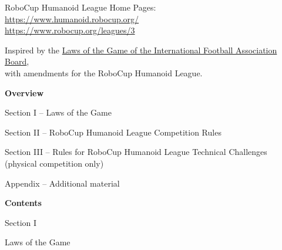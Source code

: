 \documentclass[a4paper]{article}
\begin{document}
    \medskip
    RoboCup Humanoid League Home Pages:\\
    \url{https://www.humanoid.robocup.org/}\\
    \url{https://www.robocup.org/leagues/3}

    \medskip
    Inspired by the \href{https://resources.fifa.com/image/upload/laws-of-the-game-2018-19.pdf?cloudid=khhloe2xoigyna8juxw3}{\textcolor[rgb]{0,0,0.5}{Laws of the Game of the International Football Association Board}},\\
    with amendments for the RoboCup Humanoid League.

    \setcounter{figure}{0}

    \clearpage

    {\bfseries\color[rgb]{0.4,0.4,0.4}
    Overview}

    \bigskip

    Section I -- Laws of the Game

    \bigskip

    Section II -- RoboCup Humanoid League Competition Rules
    
    \bigskip

    Section III -- Rules for RoboCup Humanoid League Technical Challenges (physical competition only)

    \bigskip

    Appendix -- Additional material

    \clearpage

    {\bfseries\color[rgb]{0.4,0.4,0.4}
    Contents}

    \renewcommand\contentsname{}
    \vspace*{-1cm}
    \tableofcontents



    \clearpage

    \begin{center}
        \Huge\bfseries{
            \vspace*{3cm}
            Section I

            \vspace*{2cm}

            Laws of the Game}
    \end{center}
\end{document}
